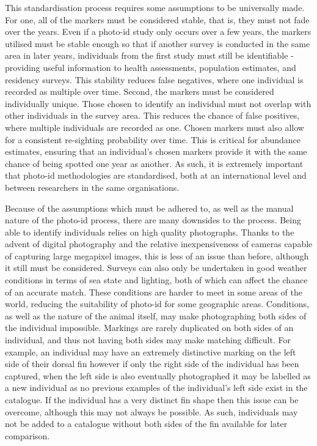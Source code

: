 This standardisation process requires some assumptions to be universally made. For one, all of the markers must be considered stable, that is, they must not fade over the years. Even if a photo-id study only occurs over a few years, the markers utilised must be stable enough so that if another survey is conducted in the same area in later years, individuals from the first study must still be identifiable - providing useful information to health assessments, population estimates, and residency surveys. This stability reduces false negatives, where one individual is recorded as multiple over time. Second, the markers must be considered individually unique. Those chosen to identify an individual must not overlap with other individuals in the survey area. This reduces the chance of false positives, where multiple individuals are recorded as one. Chosen markers must also allow for a consistent re-sighting probability over time. This is critical for abundance estimates,  ensuring that an individual's chosen markers provide it with the same chance of being spotted one year as another. As such, it is extremely important that photo-id methodologies are standardised, both at an international level and between researchers in the same organisations. 

Because of the assumptions which must be adhered to, as well as the manual nature of the photo-id process, there are many downsides to the process. Being able to identify individuals relies on high quality photographs. Thanks to the advent of digital photography and the relative inexpensiveness of cameras capable of capturing large megapixel images, this is less of an issue than before, although it still must be considered. Surveys can also only be undertaken in good weather conditions in terms of sea state and lighting, both of which can affect the chance of an accurate match. These conditions are harder to meet in some areas of the world, reducing the suitability of photo-id for some geographic areas. Conditions, as well as the nature of the animal itself, may make photographing both sides of the individual impossible. Markings are rarely duplicated on both sides of an individual, and thus not having both sides may make matching difficult. For example, an individual may have an extremely distinctive marking on the left side of their dorsal fin however if only the right side of the individual has been captured, when the left side is also eventually photographed it may be labelled as a new individual as no previous examples of the individual's left side exist in the catalogue. If the individual has a very distinct fin shape then this issue can be overcome, although this may not always be possible. As such, individuals may not be added to a catalogue without both sides of the fin available for later comparison. 

